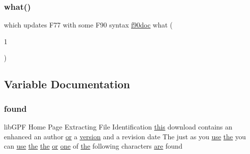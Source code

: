 \mbox{\label{what__overview_81_8txt_adadc702e2a3423fa136bfa5b1e01b511}} 
\subsubsection{\texorpdfstring{what()}{what()}}
{\footnotesize\ttfamily which updates F77 with some F90 syntax \hyperlink{what__overview_81_8txt_aab2f56fdcdfab484c0d861985675a92f}{f90doc} what (\begin{DoxyParamCaption}\item[{1}]{ }\end{DoxyParamCaption})\hspace{0.3cm}{\ttfamily [new]}}



\subsection{Variable Documentation}
\mbox{\label{what__overview_81_8txt_a4a5cd559ce9a19bdc777ce034bc845d1}} 
\subsubsection{\texorpdfstring{found}{found}}
{\footnotesize\ttfamily lib\+G\+PF Home Page Extracting File Identification \hyperlink{M__stopwatch_83_8txt_ad62a52042bb610eee5b36b5516caec22}{this} download contains an enhanced an author \hyperlink{what__overview_81_8txt_a08ee81dca94cf4ba88d4a64051e232d5}{or} a \hyperlink{inquiry__stopwatch_83_8txt_aee378be19d20935dd436517beda00ee4}{version} and a revision date The just as you \hyperlink{intro__blas1_83_8txt_a04fa2694d85f67a675bb3f45f7241f48}{use} \hyperlink{M__stopwatch_83_8txt_a0f266597de2e57eb3aa964927bb30e14}{the} you can \hyperlink{intro__blas1_83_8txt_a04fa2694d85f67a675bb3f45f7241f48}{use} \hyperlink{M__stopwatch_83_8txt_a0f266597de2e57eb3aa964927bb30e14}{the} \hyperlink{M__stopwatch_83_8txt_a0f266597de2e57eb3aa964927bb30e14}{the} \hyperlink{what__overview_81_8txt_a08ee81dca94cf4ba88d4a64051e232d5}{or} \hyperlink{M__stopwatch_83_8txt_aff7b067dcc41169a210cb1c0de45a496}{one} of \hyperlink{M__stopwatch_83_8txt_a0f266597de2e57eb3aa964927bb30e14}{the} following characters \hyperlink{M__stopwatch_83_8txt_a5040be02b832eba08820289c8a1f81c4}{are} found}

